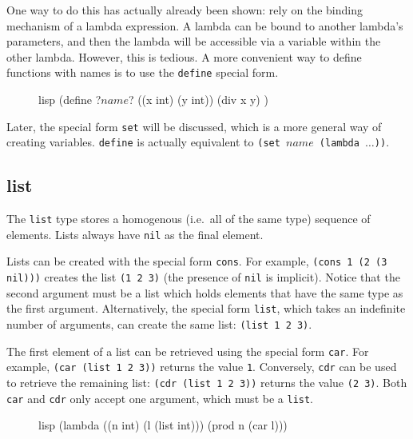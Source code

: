 \documentclass[a4paper, 12pt]{article}
\begin{document}
One way to do this has actually already been shown: rely on the binding mechanism of a lambda expression. A lambda can be bound to another lambda's parameters, and then the lambda will be accessible via a variable within the other lambda. However, this is tedious. A more convenient way to define functions with names is to use the \texttt{define} special form.

\begin{figure}[htp]
    \centering
    \begin{cminted}[autogobble=true, escapeinside=??]{lisp}
        (define ?$name$? ((x int) (y int))
          (div x y)
        )
    \end{cminted}
    \captionsetup[figure]{font=small}
\end{figure}

Later, the special form \texttt{set} will be discussed, which is a more general way of creating variables. \texttt{define} is actually equivalent to \texttt{(set $name$ (lambda $\ldots$))}.

\subsection{list}
The \texttt{list} type stores a homogenous (i.e.\ all of the same type) sequence of elements. Lists always have \texttt{nil} as the final element.

Lists can be created with the special form \texttt{cons}. For example, \texttt{(cons 1 (2 (3 nil)))} creates the list \texttt{(1 2 3)} (the presence of \texttt{nil} is implicit). Notice that the second argument must be a list which holds elements that have the same type as the first argument. Alternatively, the special form \texttt{list}, which takes an indefinite number of arguments, can create the same list: \texttt{(list 1 2 3)}.

The first element of a list can be retrieved using the special form \texttt{car}. For example, \texttt{(car (list 1 2 3))} returns the value \texttt{1}. Conversely, \texttt{cdr} can be used to retrieve the remaining list: \texttt{(cdr (list 1 2 3))} returns the value \texttt{(2 3)}. Both \texttt{car} and \texttt{cdr} only accept one argument, which must be a \texttt{list}.

\begin{figure}[htp]
    \centering
    \begin{cminted}[autogobble=true]{lisp}
        (lambda ((n int) (l (list int)))
          (prod n (car l)))
    \end{cminted}
    \captionsetup[figure]{font=small}
\end{figure}
\end{document}
